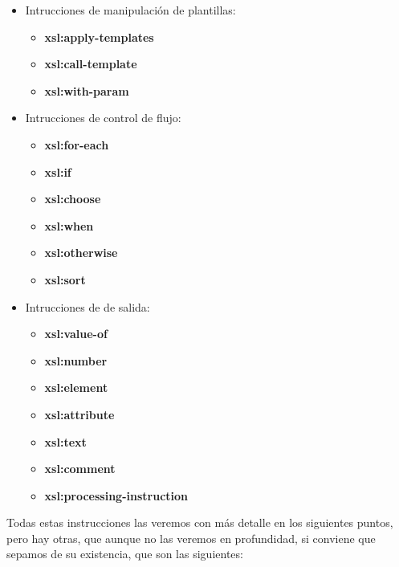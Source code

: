 \begin{itemize}
    \item Intrucciones de manipulación de plantillas:
    \begin{itemize}
        \item \textbf{xsl:apply-templates}
        \item \textbf{xsl:call-template}
        \item \textbf{xsl:with-param}
    \end{itemize}

    \item Intrucciones de control de flujo:
    \begin{itemize}
        \item \textbf{xsl:for-each}
        \item \textbf{xsl:if}
        \item \textbf{xsl:choose}
        \item \textbf{xsl:when}
        \item \textbf{xsl:otherwise}
        \item \textbf{xsl:sort}
    \end{itemize}

    \item Intrucciones de de salida:
    \begin{itemize}
        \item \textbf{xsl:value-of}
        \item \textbf{xsl:number}
        \item \textbf{xsl:element}
        \item \textbf{xsl:attribute}
        \item \textbf{xsl:text}
        \item \textbf{xsl:comment}
        \item \textbf{xsl:processing-instruction}
    \end{itemize}
\end{itemize}

Todas estas instrucciones las veremos con más detalle en los siguientes puntos, pero hay otras, que aunque no las veremos en profundidad, si conviene que sepamos de su existencia, que son las siguientes:

